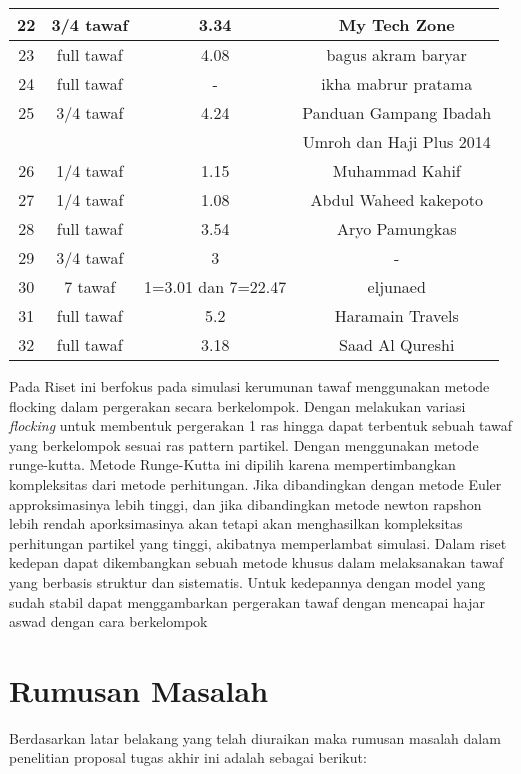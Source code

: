 \begin{table}[H]
\begin{tabular}{|c|c|c|c|}
\hline
22&3/4 tawaf&	3.34&My Tech Zone\\
\hline
23&full tawaf&	4.08&bagus akram baryar\\

\hline
24&full tawaf&	-&ikha mabrur pratama\\

\hline
25&3/4 tawaf&	4.24&Panduan Gampang Ibadah \\
& & &Umroh dan Haji  Plus 2014\\
	
\hline
26&1/4 tawaf &	1.15&Muhammad Kahif\\

\hline
27&1/4 tawaf &	1.08&Abdul Waheed kakepoto\\
	
\hline
28&full tawaf&	3.54&	Aryo Pamungkas\\

\hline
29&3/4 tawaf&	3&-\\

\hline
30&7 tawaf&	1=3.01 dan 7=22.47&eljunaed\\
\hline
31&full tawaf&	5.2&Haramain Travels\\

\hline
32&full tawaf&	3.18&Saad Al Qureshi\\
\hline

\end{tabular}
\end{table}

		
\hspace{0.6cm}Pada Riset ini berfokus pada simulasi kerumunan tawaf menggunakan metode flocking dalam pergerakan secara berkelompok. Dengan melakukan variasi \emph{flocking} untuk membentuk pergerakan 1 ras hingga dapat terbentuk sebuah tawaf yang berkelompok sesuai ras pattern partikel. Dengan menggunakan metode runge-kutta. Metode Runge-Kutta ini dipilih karena mempertimbangkan kompleksitas dari metode perhitungan. Jika dibandingkan dengan metode Euler approksimasinya lebih tinggi, dan jika dibandingkan metode newton rapshon lebih rendah aporksimasinya akan tetapi akan menghasilkan kompleksitas perhitungan partikel yang tinggi, akibatnya memperlambat simulasi.
Dalam riset kedepan dapat dikembangkan sebuah metode khusus dalam melaksanakan tawaf yang berbasis struktur dan sistematis. Untuk kedepannya dengan model yang sudah stabil dapat menggambarkan pergerakan tawaf dengan mencapai hajar aswad dengan cara berkelompok   


\section{Rumusan Masalah}\label{sec:rumusan}
Berdasarkan latar belakang yang telah diuraikan maka rumusan masalah dalam penelitian proposal tugas akhir ini adalah sebagai berikut: 

